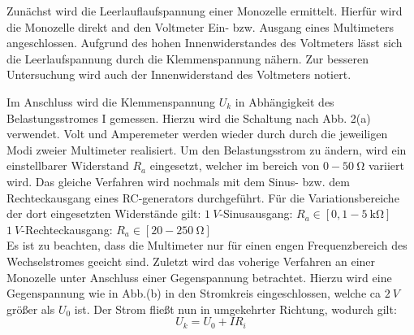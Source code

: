     Zunächst wird die Leerlauflaufspannung einer Monozelle ermittelt. Hierfür
     wird die Monozelle direkt and den Voltmeter Ein- bzw. Ausgang eines
      Multimeters angeschlossen. Aufgrund des hohen Innenwiderstandes des Voltmeters
       lässt sich die Leerlaufspannung durch die Klemmenspannung nähern. Zur besseren
        Untersuchung wird auch der Innenwiderstand des Voltmeters notiert.

Im Anschluss wird die Klemmenspannung $U_k$ in Abhängigkeit des Belastungsstromes I gemessen.
 Hierzu wird die Schaltung nach Abb. 2(a) verwendet. Volt und Amperemeter werden wieder durch
  durch die jeweiligen Modi zweier Multimeter realisiert. Um den Belastungsstrom
   zu ändern, wird ein einstellbarer Widerstand $R_a$ eingesetzt, welcher im bereich von
    $0-\SI{50}{\ohm}$ variiert wird. Das gleiche Verfahren wird nochmals mit dem Sinus- bzw.
    dem Rechteckausgang eines RC-generators durchgeführt. Für die Variationsbereiche
     der dort eingesetzten Widerstände gilt:
     $\SI{1}{V}$-Sinusausgang: $R_a \in [0,1 -\SI{5}{\kilo\ohm}]$\\
     $\SI{1}{V}$-Rechteckausgang: $R_a \in [20 -\SI{250}{\ohm}]$\\
     
Es ist zu beachten, dass die Multimeter nur für einen engen Frequenzbereich des
 Wechselstromes geeicht sind. Zuletzt wird das voherige Verfahren an einer Monozelle
  unter Anschluss einer Gegenspannung betrachtet. Hierzu wird eine Gegenspannung
   wie in Abb.(b) in den Stromkreis eingeschlossen, welche ca $\SI{2}{V}$ größer als
   $U_0$ ist. Der Strom fließt nun in umgekehrter Richtung, wodurch gilt:
   \begin{equation}
     U_k = U_0 + IR_i
     \end{equation}
